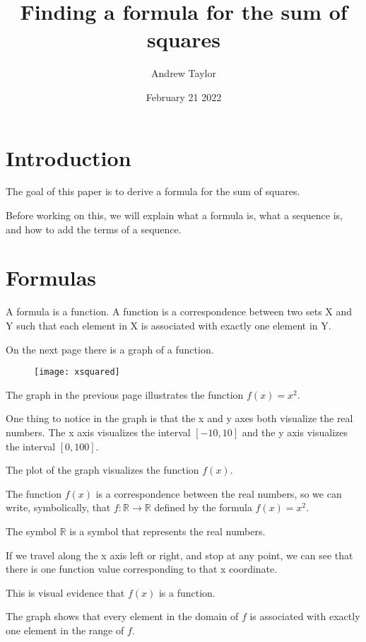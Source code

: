 \documentclass{article}
\title{Finding a formula for the sum of squares}
\author{Andrew Taylor}
\date{February 21 2022}
\begin{document}
\maketitle
\section{Introduction}
\begin{flushleft}
The goal of this paper is to derive a formula for the sum of squares. 
\end{flushleft}
\begin{flushleft}
Before working on this, we will explain what a formula is, what a sequence is, and how to add the terms of a sequence.
\end{flushleft}
\section{Formulas}
\begin{flushleft}
A formula is a function. A function is a correspondence between two sets X and Y such that each element in X is associated with exactly one element in Y.
\end{flushleft}
\begin{flushleft}
On the next page there is a graph of a function.
\end{flushleft}
\begin{figure}
\centering
\texttt{[image: xsquared]}
\end{figure}
\clearpage
\begin{flushleft}
The graph in the previous page illustrates the function $f(x) = x^2$. 
\end{flushleft}
\begin{flushleft}
One thing to notice in the graph is that the x and y axes both visualize the real numbers. The x axis visualizes the interval $[-10, 10]$ and the y axis visualizes the interval $[0, 100]$.
\end{flushleft}
\begin{flushleft}
The plot of the graph visualizes the function $f(x)$. 
\end{flushleft}
\begin{flushleft}
The function $f(x)$ is a correspondence between the real numbers, so we can write, symbolically, that $f : \mathbb{R} \rightarrow \mathbb{R}$ defined by the formula $f(x) = x^2$. 
\end{flushleft}
\begin{flushleft}
The symbol $\mathbb{R}$ is a symbol that represents the real numbers.
\end{flushleft}
\begin{flushleft}
If we travel along the x axis left or right, and stop at any point, we can see that there is one function value corresponding to that x coordinate. 
\end{flushleft}
\begin{flushleft}
This is visual evidence that $f(x)$ is a function.
\end{flushleft}
\begin{flushleft}
The graph shows that every element in the domain of $f$ is associated with exactly one element in the range of $f$.
\end{flushleft}
\end{document}

